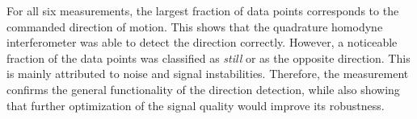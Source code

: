 For all six measurements, the largest fraction of data points corresponds to the commanded direction of motion. This shows that the quadrature homodyne interferometer was able to detect the direction correctly. However, a noticeable fraction of the data points was classified as \textit{still} or as the opposite direction. This is mainly attributed to noise and signal instabilities. Therefore, the measurement confirms the general functionality of the direction detection, while also showing that further optimization of the signal quality would improve its robustness.


